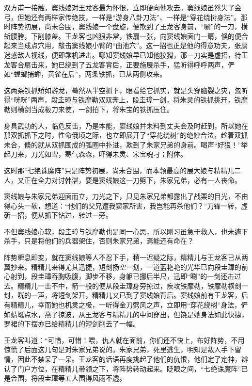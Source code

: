 \documentclass[12pt,oneside]{book}
\begin{document}
双方甫一接触，窦线娘对王龙客最为怀恨，立即便向他攻去。窦线娘虽然失了金弓，但她还有两样家传绝技，一样是``游身八卦刀法''、一样是``穿花绕树身法''。那时阵势初展，尚未合围，窦线娘一个盘旋，便欺到了王龙客身前，``唰''的一刀，横斩腰胯，下削膝盖。王龙客也凶狠非常，铁扇一张，向窦线娘面门一扇，倏的便合起来当成点穴用，敲击窦线娘小臂的``曲池穴''。这一招也正是他的得意功夫，张扇迷惑敌人视线，便即乘机进击。哪知窦线娘早已知他狡猾，那一刀实是虚招，待王龙客合扇击来，她已绕到了五龙客背后，正要施展杀手，猛听得呼呼两声，俨如``螳螂捕蝉，黄雀在后''，两条铁抓，已从两侧攻来。

这两条铁抓矫如游龙，蓦然从半空抓下，眼看给它抓实，就是头穿脑裂之灾，忽听得``咣咣''两声，段圭璋与铁摩勒双双奔上，段圭璋一剑，将朱灵的铁抓挑开，铁摩勒则横剑当成板刀来使，一剑拍下，将朱宝的铁抓压住。

身具武功的人，临危反击，乃是本能，窦线娘并未料到丈夫会及时赶到，所以她在那双抓抓下之时，性命俄顷之际，也立即展开了``穿花绕树''的绝妙合法，趁着双抓未合，倏的就从双抓围成的弧圈中扑进，欺到了朱家兄弟的身前。喝声``好狠！''举起刀来，刀光如雪，寒气森森，吓得未灵、宋宝魂刁；附体。

这时那``七绝诛魔阵''只是阵势初展，尚未合围，而本领最高的展大娘与精精儿二人，又正在全力对讨韩湛，要是窦线娘这一刀劈下，朱家兄弟，必有一人丧命。

窦线娘与朱家兄弟迎面而立，刀光之下，只见朱家兄弟都露出了战栗的目光，不由得心头一软，想道：``他们的父兄遭我窦家所害，我岂能再杀他们？''刀锋一转，虚斫一招，便从抓下钻过，转过一旁。

不但窦线娘心软，段圭璋与铁摩勒也是同一心思，所以刚习虽急于救人，也未遽下杀手，只是将他们的兵器架住，否则朱家兄弟，焉能还有命在？

阵势瞬息即变，就在窦线娘等人不忍下手，稍一迟疑之际，精精儿与王龙客已从两翼抄来。精精儿来得尤其迅捷，短剑扬空一划，一道蓝艳艳的光华已向段圭璋的前心射到，段圭璋吞胸吸腹，脚步不移，身躯已挪后半尺，迅即``唰''的一剑还击过去。精精儿一击不中，箭一般的便从段圭璋身旁掠过，疾攻铁摩勒，铁摩勒横剑一封，咣的一声，将短剑架开，精精儿又已到了窦线娘背后。窦线娘前有王龙客，后有精精儿，幸而她也机灵之极，一听得金刀劈风之声，立即用``穿花绕树''身法，俨如蜻蜒点水，燕子掠波，从王龙客与精精儿的中间穿出，但饶是她身法如此快捷，罗裙的下摆亦已给精精儿的短剑削去了一幅。

王龙客叫道：``可惜，可惜！喂，仇人就在面前，你们还不快上，布好阵势，不用惊慌了后面这几句是对朱家兄弟说的。朱家兄弟，死里逃生，明知是敌人手下留情，因此不禁呆了一呆。王龙客的话语再度挑起了他们的仇恨，他们定了定神，辨认了门户方位，在精精儿带领之下，将阵势转动起来。眨眼之间，``七绝诛魔阵''已是合围，将段圭璋等五人围得风雨不透。
\end{document}
